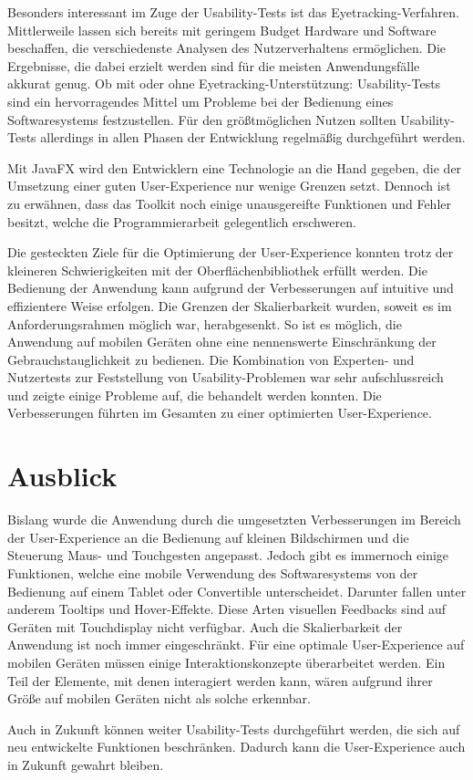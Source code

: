 Besonders interessant im Zuge der Usability-Tests ist das Eyetracking-Verfahren. Mittlerweile lassen sich bereits mit geringem Budget Hardware und Software beschaffen, die verschiedenste Analysen des Nutzerverhaltens ermöglichen. Die Ergebnisse, die dabei erzielt werden sind für die meisten Anwendungsfälle akkurat genug. Ob mit oder ohne Eyetracking-Unterstützung: Usability-Tests sind ein hervorragendes Mittel um Probleme bei der Bedienung eines Softwaresystems festzustellen. Für den größtmöglichen Nutzen sollten Usability-Tests allerdings in allen Phasen der Entwicklung regelmäßig durchgeführt werden.\par
Mit JavaFX wird den Entwicklern eine Technologie an die Hand gegeben, die der Umsetzung einer guten User-Experience nur wenige Grenzen setzt. Dennoch ist zu erwähnen, dass das Toolkit noch einige unausgereifte Funktionen und Fehler besitzt, welche die Programmierarbeit gelegentlich erschweren.\par
Die gesteckten Ziele für die Optimierung der User-Experience konnten trotz der kleineren Schwierigkeiten mit der Oberflächenbibliothek erfüllt werden. Die Bedienung der Anwendung kann aufgrund der Verbesserungen auf intuitive und effizientere Weise erfolgen. Die Grenzen der Skalierbarkeit wurden, soweit es im Anforderungsrahmen möglich war, herabgesenkt. So ist es möglich, die Anwendung auf mobilen Geräten ohne eine nennenswerte Einschränkung der Gebrauchstauglichkeit zu bedienen. Die Kombination von Experten- und Nutzertests zur Feststellung von Usability-Problemen war sehr aufschlussreich und zeigte einige Probleme auf, die behandelt werden konnten. Die Verbesserungen führten im Gesamten zu einer optimierten User-Experience.\par
\section{Ausblick}
Bislang wurde die Anwendung durch die umgesetzten Verbesserungen im Bereich der User-Experience an die Bedienung auf kleinen Bildschirmen und die Steuerung Maus- und Touchgesten angepasst. Jedoch gibt es immernoch einige Funktionen, welche eine mobile Verwendung des Softwaresystems von der Bedienung auf einem Tablet oder Convertible unterscheidet. Darunter fallen unter anderem Tooltips und Hover-Effekte. Diese Arten visuellen Feedbacks sind auf Geräten mit Touchdisplay nicht verfügbar. Auch die Skalierbarkeit der Anwendung ist noch immer eingeschränkt. Für eine optimale User-Experience auf mobilen Geräten müssen einige Interaktionskonzepte überarbeitet werden. Ein Teil der Elemente, mit denen interagiert werden kann, wären aufgrund ihrer Größe auf mobilen Geräten nicht als solche erkennbar.\par
Auch in Zukunft können weiter Usability-Tests durchgeführt werden, die sich auf neu entwickelte Funktionen beschränken. Dadurch kann die User-Experience auch in Zukunft gewahrt bleiben.\par